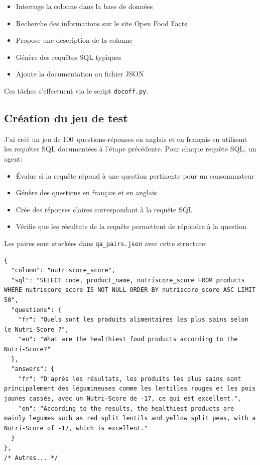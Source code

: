 \documentclass[a4paper,11pt]{article}
\begin{document}
\begin{itemize}
    \item Interroge la colonne dans la base de données
    \item Recherche des informations sur le site Open Food Facts
    \item Propose une description de la colonne
    \item Génère des requêtes SQL typiques
    \item Ajoute la documentation au fichier JSON
\end{itemize}

Ces tâches s'effectuent via le script \texttt{docoff.py}.


\subsection{Création du jeu de test}

J'ai créé un jeu de 100~questions-réponses en anglais et en français 
en utilisant les requêtes SQL documentées à l'étape précédente. 
Pour chaque requête SQL, un agent:

\begin{itemize}
    \item Évalue si la requête répond à une question pertinente pour un consommateur
    \item Génère des questions en français et en anglais
    \item Crée des réponses claires correspondant à la requête SQL
    \item Vérifie que les résultats de la requête permettent de répondre à la question
\end{itemize}

\newpage
Les paires sont stockées dans \texttt{qa\_pairs.json} avec cette structure:

\begin{lstlisting}
{
  "column": "nutriscore_score",
  "sql": "SELECT code, product_name, nutriscore_score FROM products WHERE nutriscore_score IS NOT NULL ORDER BY nutriscore_score ASC LIMIT 50",
  "questions": {
    "fr": "Quels sont les produits alimentaires les plus sains selon le Nutri-Score ?",
    "en": "What are the healthiest food products according to the Nutri-Score?"
  },
  "answers": {
    "fr": "D'après les résultats, les produits les plus sains sont principalement des légumineuses comme les lentilles rouges et les pois jaunes cassés, avec un Nutri-Score de -17, ce qui est excellent.",
    "en": "According to the results, the healthiest products are mainly legumes such as red split lentils and yellow split peas, with a Nutri-Score of -17, which is excellent."
  }
},
/* Autres... */
\end{lstlisting}
\end{document}
